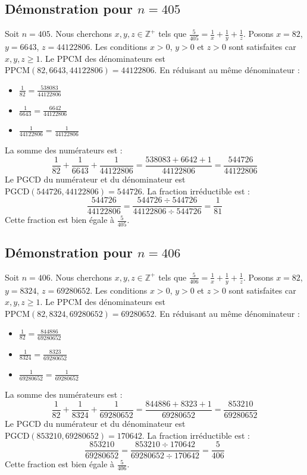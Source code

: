 \documentclass[11pt,a4paper]{article}
\begin{document}
\subsection{Démonstration pour $n = 405$}
Soit $n = 405$. Nous cherchons $x, y, z \in \mathbb{Z}^{+}$ tels que $\frac{5}{405} = \frac{1}{x} + \frac{1}{y} + \frac{1}{z}$.
Posons $x = 82$, $y = 6643$, $z = 44122806$.
Les conditions $x > 0$, $y > 0$ et $z > 0$ sont satisfaites car $x, y, z \geq 1$.
Le PPCM des dénominateurs est $\text{PPCM}(82, 6643, 44122806) = 44122806$.
En réduisant au même dénominateur :
\begin{itemize}
    \item $\frac{1}{82} = \frac{538083}{44122806}$
    \item $\frac{1}{6643} = \frac{6642}{44122806}$
    \item $\frac{1}{44122806} = \frac{1}{44122806}$
\end{itemize}
La somme des numérateurs est :
$$ \frac{1}{82} + \frac{1}{6643} + \frac{1}{44122806} = \frac{538083 + 6642 + 1}{44122806} = \frac{544726}{44122806} $$
Le PGCD du numérateur et du dénominateur est $\text{PGCD}(544726, 44122806) = 544726$.
La fraction irréductible est :
$$ \frac{544726}{44122806} = \frac{544726 \div 544726}{44122806 \div 544726} = \frac{1}{81} $$
Cette fraction est bien égale à $\frac{5}{405}$.

\subsection{Démonstration pour $n = 406$}
Soit $n = 406$. Nous cherchons $x, y, z \in \mathbb{Z}^{+}$ tels que $\frac{5}{406} = \frac{1}{x} + \frac{1}{y} + \frac{1}{z}$.
Posons $x = 82$, $y = 8324$, $z = 69280652$.
Les conditions $x > 0$, $y > 0$ et $z > 0$ sont satisfaites car $x, y, z \geq 1$.
Le PPCM des dénominateurs est $\text{PPCM}(82, 8324, 69280652) = 69280652$.
En réduisant au même dénominateur :
\begin{itemize}
    \item $\frac{1}{82} = \frac{844886}{69280652}$
    \item $\frac{1}{8324} = \frac{8323}{69280652}$
    \item $\frac{1}{69280652} = \frac{1}{69280652}$
\end{itemize}
La somme des numérateurs est :
$$ \frac{1}{82} + \frac{1}{8324} + \frac{1}{69280652} = \frac{844886 + 8323 + 1}{69280652} = \frac{853210}{69280652} $$
Le PGCD du numérateur et du dénominateur est $\text{PGCD}(853210, 69280652) = 170642$.
La fraction irréductible est :
$$ \frac{853210}{69280652} = \frac{853210 \div 170642}{69280652 \div 170642} = \frac{5}{406} $$
Cette fraction est bien égale à $\frac{5}{406}$.
\end{document}
